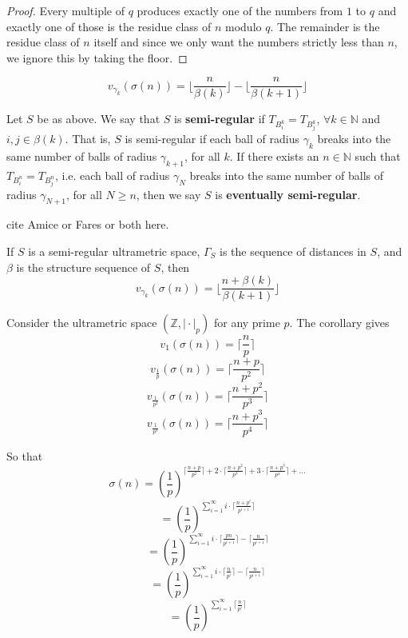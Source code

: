 \begin{proof}
Every multiple of $q$ produces exactly one of the numbers from $1$ to $q$ and exactly one of those is the residue class of $n$ modulo $q$. The remainder is the residue class of $n$ itself and since we only want the numbers strictly less than $n$, we ignore this by taking the floor.
\end{proof}


\begin{proposition*}
\[v_{\gamma_k}(\sigma(n)) = \lfloor\frac{n}{\beta(k)}\rfloor - \lfloor\frac{n}{\beta(k+1)}\rfloor \]
\end{proposition*}

\begin{definition*}
Let $S$ be as above. We say that $S$ is \textbf{semi-regular} if $T_{B^k_i} = T_{B^k_j}$, $\forall k \in \mathbb{N}$ and  $i,j \in \beta(k)$. That is, $S$ is semi-regular if each ball of radius $\gamma_k$ breaks into the same number of balls of radius $\gamma_{k+1}$, for all $k$. If there exists an $n \in \mathbb{N}$ such that $T_{B^n_i} = T_{B^n_j}$, i.e.  each ball of radius $\gamma_N$ breaks into the same number of balls of radius $\gamma_{N+1}$, for all $N \geq n$, then we say $S$ is \textbf{eventually semi-regular}.
\end{definition*}
cite Amice or Fares or both here.

\begin{corollary*}
If $S$ is a semi-regular ultrametric space, $\Gamma_S$ is the sequence of distances in $S$, and $\beta$ is the structure sequence of $S$, then \[v_{\gamma_k}(\sigma(n)) = \lfloor\frac{n +\beta(k)}{\beta(k+1)}\rfloor \]
\end{corollary*}

\begin{example}
Consider the ultrametric space $(\mathbb{Z}, \rvert \cdot \lvert_p)$  for any prime $p$. The corollary gives 
\[v_{1}(\sigma(n)) = \lceil\frac{n}{p}\rceil\]
\[v_{\frac{1}{p}}(\sigma(n)) = \lceil\frac{n +p }{p^2}\rceil\]
\[v_{\frac{1}{p^2}}(\sigma(n)) = \lceil\frac{n + p^2}{p^3}\rceil\]
\[v_{\frac{1}{p^3}}(\sigma(n)) = \lceil\frac{n + p^3}{p^4}\rceil\]

So that \[\sigma(n) = (\frac{1}{p})^ { \lceil\frac{n + p}{p^2}\rceil + 2 \cdot  \lceil\frac{n +p^2}{p^3}\rceil + 3 \cdot  \lceil\frac{n + p^3}{p^4}\rceil + \ldots}\]
\[ = (\frac{1}{p})^ { \sum_{i=1}^\infty i \cdot \lceil\frac{n + p^i}{p^{i+1}}\rceil }\]
\[ = (\frac{1}{p})^ { \sum_{i=1}^\infty i \cdot \lceil\frac{pn}{p^{i+1}}\rceil -  \lceil\frac{n}{p^{i+1}}\rceil }\]
\[ = (\frac{1}{p})^ { \sum_{i=1}^\infty i \cdot \lceil\frac{n}{p^{i}}\rceil -  \lceil\frac{n}{p^{i+1}}\rceil }\]
\[ = (\frac{1}{p})^ { \sum_{i=1}^\infty \lceil \frac{n}{p^{i}}\rceil}\]
\end{example}

